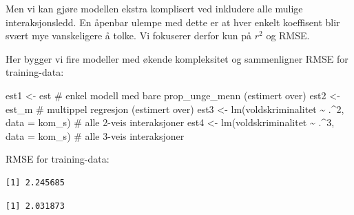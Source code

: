 \documentclass[
  letterpaper,
  DIV=11,
  numbers=noendperiod]{scrreprt}
\newenvironment{Shaded}{\begin{snugshade}}{\end{snugshade}}
\newcommand{\AttributeTok}[1]{\textcolor[rgb]{0.40,0.45,0.13}{#1}}
\newcommand{\CommentTok}[1]{\textcolor[rgb]{0.37,0.37,0.37}{#1}}
\newcommand{\DecValTok}[1]{\textcolor[rgb]{0.68,0.00,0.00}{#1}}
\newcommand{\FunctionTok}[1]{\textcolor[rgb]{0.28,0.35,0.67}{#1}}
\newcommand{\NormalTok}[1]{\textcolor[rgb]{0.00,0.23,0.31}{#1}}
\newcommand{\OtherTok}[1]{\textcolor[rgb]{0.00,0.23,0.31}{#1}}
\newcommand{\SpecialCharTok}[1]{\textcolor[rgb]{0.37,0.37,0.37}{#1}}
\begin{document}
Men vi kan gjøre modellen ekstra komplisert ved inkludere alle mulige
interaksjonsledd. En åpenbar ulempe med dette er at hver enkelt
koeffisent blir svært mye vanskeligere å tolke. Vi fokuserer derfor kun
på \(r^2\) og RMSE.

Her bygger vi fire modeller med økende kompleksitet og sammenligner RMSE
for training-data:

\begin{Shaded}
\begin{Highlighting}[]
\NormalTok{est1 }\OtherTok{\textless{}{-}}\NormalTok{ est     }\CommentTok{\# enkel modell med bare prop\_unge\_menn (estimert over)}
\NormalTok{est2 }\OtherTok{\textless{}{-}}\NormalTok{ est\_m   }\CommentTok{\# multippel regresjon (estimert over)}
\NormalTok{est3 }\OtherTok{\textless{}{-}} \FunctionTok{lm}\NormalTok{(voldskriminalitet }\SpecialCharTok{\textasciitilde{}}\NormalTok{ .}\SpecialCharTok{\^{}}\DecValTok{2}\NormalTok{, }\AttributeTok{data =}\NormalTok{ kom\_s)    }\CommentTok{\# alle 2{-}veis interaksjoner}
\NormalTok{est4 }\OtherTok{\textless{}{-}} \FunctionTok{lm}\NormalTok{(voldskriminalitet }\SpecialCharTok{\textasciitilde{}}\NormalTok{ .}\SpecialCharTok{\^{}}\DecValTok{3}\NormalTok{, }\AttributeTok{data =}\NormalTok{ kom\_s)    }\CommentTok{\# alle 3{-}veis interaksjoner}
\end{Highlighting}
\end{Shaded}

RMSE for training-data:

\begin{Shaded}
\end{Shaded}

\begin{verbatim}
[1] 2.245685
\end{verbatim}

\begin{Shaded}
\end{Shaded}

\begin{verbatim}
[1] 2.031873
\end{verbatim}
\end{document}
